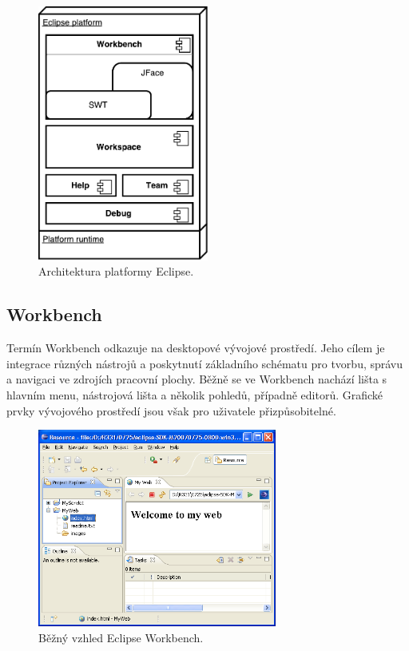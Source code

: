   \begin{figure}[h]
    \includegraphics[width=0.5\textwidth, center]{obrazky-figures/eclipse_arch.pdf}
    \caption{Architektura platformy Eclipse.}
    \label{fig:eclipse_arch}
  \end{figure}

    \subsection{Workbench}
    Termín Workbench odkazuje na desktopové vývojové prostředí. Jeho cílem je integrace různých nástrojů a poskytnutí základního schématu pro tvorbu, správu a navigaci ve zdrojích pracovní plochy. Běžně se ve Workbench nachází lišta s hlavním menu, nástrojová lišta a několik pohledů, případně editorů\cite{eclipse-workbench}. Grafické prvky vývojového prostředí jsou však pro uživatele přizpůsobitelné.

    \begin{figure}[h]
      \includegraphics[width=0.7\textwidth, center]{obrazky-figures/eclipse_workbench.png}
      \caption{Běžný vzhled Eclipse Workbench.}
      \label{fig:eclipse_workbench}
    \end{figure}

